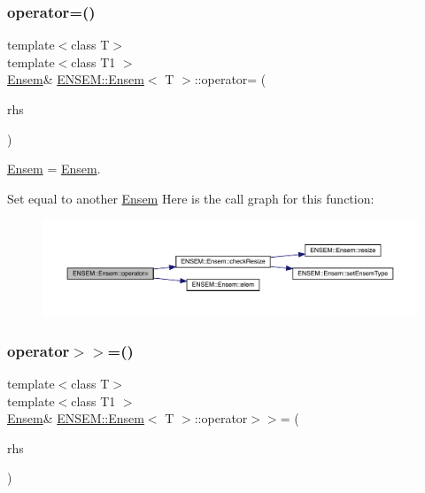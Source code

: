 \subsubsection{\texorpdfstring{operator=()}{operator=()}\hspace{0.1cm}{\footnotesize\ttfamily [15/15]}}
{\footnotesize\ttfamily template$<$class T$>$ \\
template$<$class T1 $>$ \\
\mbox{\hyperlink{classENSEM_1_1Ensem}{Ensem}}\& \mbox{\hyperlink{classENSEM_1_1Ensem}{E\+N\+S\+E\+M\+::\+Ensem}}$<$ T $>$\+::operator= (\begin{DoxyParamCaption}\item[{const \mbox{\hyperlink{classENSEM_1_1Ensem}{Ensem}}$<$ T1 $>$ \&}]{rhs }\end{DoxyParamCaption})\hspace{0.3cm}{\ttfamily [inline]}}



\mbox{\hyperlink{classENSEM_1_1Ensem}{Ensem}} = \mbox{\hyperlink{classENSEM_1_1Ensem}{Ensem}}. 

Set equal to another \mbox{\hyperlink{classENSEM_1_1Ensem}{Ensem}} Here is the call graph for this function\+:
\nopagebreak
\begin{figure}[H]
\begin{center}
\leavevmode
\includegraphics[width=350pt]{d7/d3e/classENSEM_1_1Ensem_a83f34607867df5f1fb9ad887354de48d_cgraph}
\end{center}
\end{figure}
\mbox{\label{classENSEM_1_1Ensem_a9511b1d1b45de39920d451700eecd4d9}} 
\subsubsection{\texorpdfstring{operator$>$$>$=()}{operator>>=()}\hspace{0.1cm}{\footnotesize\ttfamily [1/3]}}
{\footnotesize\ttfamily template$<$class T$>$ \\
template$<$class T1 $>$ \\
\mbox{\hyperlink{classENSEM_1_1Ensem}{Ensem}}\& \mbox{\hyperlink{classENSEM_1_1Ensem}{E\+N\+S\+E\+M\+::\+Ensem}}$<$ T $>$\+::operator$>$$>$= (\begin{DoxyParamCaption}\item[{const \mbox{\hyperlink{classENSEM_1_1EScalar}{E\+Scalar}}$<$ T1 $>$ \&}]{rhs }\end{DoxyParamCaption})\hspace{0.3cm}{\ttfamily [inline]}}



